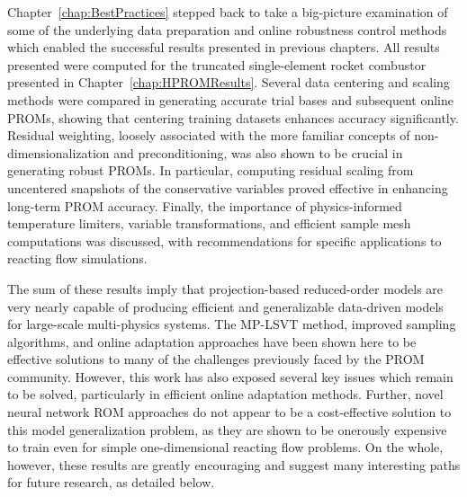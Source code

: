Chapter~\ref{chap:BestPractices} stepped back to take a big-picture examination of some of the underlying data preparation and online robustness control methods which enabled the successful results presented in previous chapters. All results presented were computed for the truncated single-element rocket combustor presented in Chapter~\ref{chap:HPROMResults}. Several data centering and scaling methods were compared in generating accurate trial bases and subsequent online PROMs, showing that centering training datasets enhances accuracy significantly. Residual weighting, loosely associated with the more familiar concepts of non-dimensionalization and preconditioning, was also shown to be crucial in generating robust PROMs. In particular, computing residual scaling from uncentered snapshots of the conservative variables proved effective in enhancing long-term PROM accuracy. Finally, the importance of physics-informed temperature limiters, variable transformations, and efficient sample mesh computations was discussed, with recommendations for specific applications to reacting flow simulations.

The sum of these results imply that projection-based reduced-order models are very nearly capable of producing efficient and generalizable data-driven models for large-scale multi-physics systems. The MP-LSVT method, improved sampling algorithms, and online adaptation approaches have been shown here to be effective solutions to many of the challenges previously faced by the PROM community. However, this work has also exposed several key issues which remain to be solved, particularly in efficient online adaptation methods. Further, novel neural network ROM approaches do not appear to be a cost-effective solution to this model generalization problem, as they are shown to be onerously expensive to train even for simple one-dimensional reacting flow problems. On the whole, however, these results are greatly encouraging and suggest many interesting paths for future research, as detailed below.